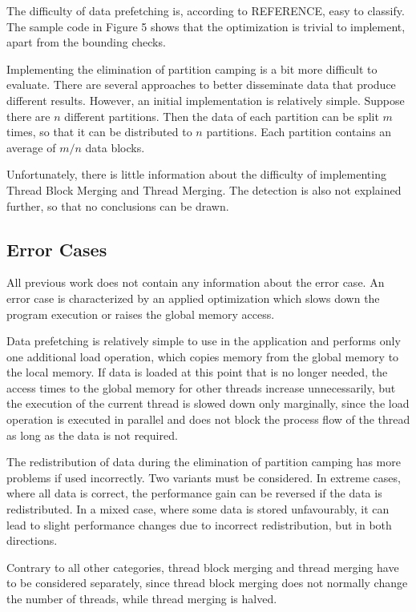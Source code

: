 \documentclass[conference]{IEEEtran}
\begin{document}
		The difficulty of data prefetching is, according to REFERENCE, easy to classify. The sample code in Figure 5 shows that the optimization is trivial to implement, apart from the bounding checks.
		
		Implementing the elimination of partition camping is a bit more difficult to evaluate. There are several approaches to better disseminate data that produce different results. However, an initial implementation is relatively simple. 
		Suppose there are $n$ different partitions. Then the data of each partition can be split $m$ times, so that it can be distributed to $n$ partitions. Each partition contains an average of $m/n$ data blocks.
		
		
		Unfortunately, there is little information about the difficulty of implementing Thread Block Merging and Thread Merging. The detection is also not explained further, so that no conclusions can be drawn.
		
	
	\subsection{Error Cases}
	
		All previous work does not contain any information about the error case. An error case is characterized by an applied optimization which slows down the program execution or raises the global memory access.
		
		Data prefetching is relatively simple to use in the application and performs only one additional load operation, which copies memory from the global memory to the local memory. If data is loaded at this point that is no longer needed, the access times to the global memory for other threads increase unnecessarily, but the execution of the current thread is slowed down only marginally, since the load operation is executed in parallel and does not block the process flow of the thread as long as the data is not required.
		
		The redistribution of data during the elimination of partition camping has more problems if used incorrectly. Two variants must be considered.
		In extreme cases, where all data is correct, the performance gain can be reversed if the data is redistributed. 
		In a mixed case, where some data is stored unfavourably, it can lead to slight performance changes due to incorrect redistribution, but in both directions.

		Contrary to all other categories, thread block merging and thread merging have to be considered separately, since thread block merging does not normally change the number of threads, while thread merging is halved.
		
\end{document}

